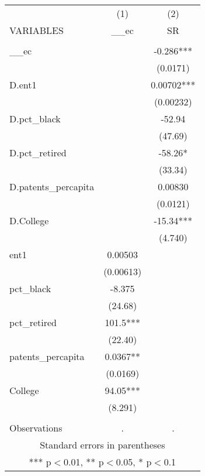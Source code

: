 \begin{tabular}{lcc} \hline
 & (1) & (2) \\
VARIABLES & \_\_ec & SR \\ \hline
 &  &  \\
\_\_ec &  & -0.286*** \\
 &  & (0.0171) \\
D.ent1 &  & 0.00702*** \\
 &  & (0.00232) \\
D.pct\_black &  & -52.94 \\
 &  & (47.69) \\
D.pct\_retired &  & -58.26* \\
 &  & (33.34) \\
D.patents\_percapita &  & 0.00830 \\
 &  & (0.0121) \\
D.College &  & -15.34*** \\
 &  & (4.740) \\
ent1 & 0.00503 &  \\
 & (0.00613) &  \\
pct\_black & -8.375 &  \\
 & (24.68) &  \\
pct\_retired & 101.5*** &  \\
 & (22.40) &  \\
patents\_percapita & 0.0367** &  \\
 & (0.0169) &  \\
College & 94.05*** &  \\
 & (8.291) &  \\
 &  &  \\
 Observations & . & . \\ \hline
\multicolumn{3}{c}{ Standard errors in parentheses} \\
\multicolumn{3}{c}{ *** p$<$0.01, ** p$<$0.05, * p$<$0.1} \\
\end{tabular}
